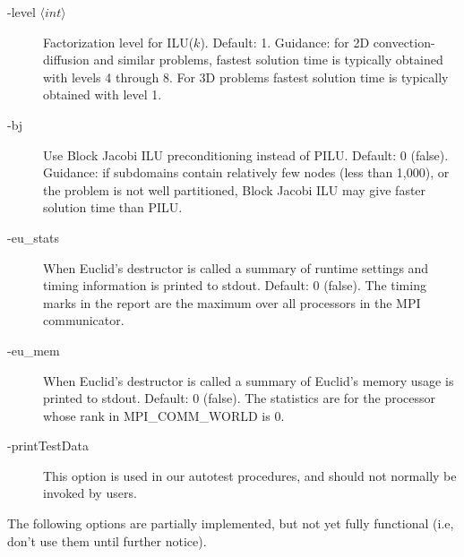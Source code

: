 \begin{description}
\item[-level $\langle int \rangle$] Factorization level for ILU($k$).  
           Default: 1.
           Guidance: for 2D convection-diffusion and similar problems, 
           fastest solution time is typically obtained with levels 4 through
           8.  For 3D problems fastest solution time is typically 
           obtained with level 1.
                    
\item[-bj] Use Block Jacobi ILU preconditioning instead of PILU.
           Default: 0 (false). Guidance: if subdomains contain
           relatively few nodes (less than 1,000), or the problem is
           not well partitioned, Block Jacobi ILU 
           may give faster solution time than PILU.
\item[-eu\_stats] When Euclid's destructor is called a summary of
                 runtime settings and timing information is printed
                 to stdout.  Default: 0 (false).
                 The timing marks in the report are the maximum over 
                 all processors in the MPI communicator.
\item[-eu\_mem] When Euclid's destructor is called a summary of
               Euclid's memory usage is printed to stdout.
               Default: 0 (false).
               The statistics are for the processor whose rank 
               in MPI\_COMM\_WORLD is 0.
\item[-printTestData] This option is used in our autotest procedures,
                 and should not normally be invoked by users.
\end{description}

The following options are partially implemented, but not
yet fully functional (i.e, don't use them until further notice).

